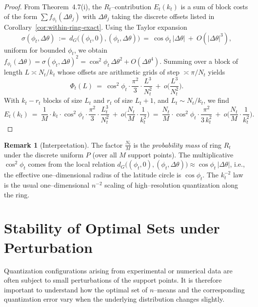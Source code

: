 \documentclass[12pt, reqno]{amsart}
\theoremstyle{plain}
\theoremstyle{definition}
\newtheorem{remark}[subsection]{Remark}
\begin{document}
\begin{proof}
From Theorem~4.7\textup{(i)}, the $R_t$--contribution $E_t(k_t)$ is a sum of block costs of the form
$\sum f_{\phi_t}(\Delta\theta_j)$ with $\Delta\theta_j$ taking the discrete offsets listed in
Corollary~\ref{cor:within-ring-exact}. Using the Taylor expansion
\[
\sigma(\phi_t,\Delta\theta)\ :=\ d_G\big((\phi_t,0),(\phi_t,\Delta\theta)\big)
\ =\ \cos\phi_t\,|\Delta\theta|\ +\ O(|\Delta\theta|^3),
\]
uniform for bounded $\phi_t$, we obtain
$f_{\phi_t}(\Delta\theta)=\sigma(\phi_t,\Delta\theta)^2
= \cos^2\!\phi_t\,\Delta\theta^2 + O(\Delta\theta^4)$. Summing over a block of length
$L\asymp N_t/k_t$ whose offsets are arithmetic grids of step $\asymp \pi/N_t$ yields
\[
\Phi_t(L)\ =\ \cos^2\!\phi_t\cdot \frac{\pi^2}{3}\cdot \frac{L^3}{N_t^2}\ +\ o\!\Big(\frac{L^3}{N_t^2}\Big).
\]
With $k_t-r_t$ blocks of size $L_t$ and $r_t$ of size $L_t+1$, and $L_t\sim N_t/k_t$, we find
\[
E_t(k_t)\ =\ \frac{1}{M}\cdot k_t\cdot \cos^2\!\phi_t\cdot \frac{\pi^2}{3}\cdot \frac{L_t^3}{N_t^2}
\ +\ o\!\Big(\frac{N_t}{M}\cdot\frac{1}{k_t^2}\Big)
\ =\ \frac{N_t}{M}\cdot \cos^2\!\phi_t\cdot \frac{\pi^2}{3\,k_t^2}
\ +\ o\!\Big(\frac{N_t}{M}\cdot\frac{1}{k_t^2}\Big).
\]
\end{proof}

\begin{remark}[Interpretation]
The factor $\frac{N_t}{M}$ is the \emph{probability mass} of ring $R_t$ under the discrete uniform $P$
(over all $M$ support points). The multiplicative $\cos^2\!\phi_t$ comes from the local relation
$d_G\big((\phi_t,0),(\phi_t,\Delta\theta)\big)\approx \cos\phi_t\,|\Delta\theta|$, i.e., the
effective one--dimensional radius of the latitude circle is $\cos\phi_t$. The $k_t^{-2}$ law is the
usual one--dimensional $n^{-2}$ scaling of high--resolution quantization along the ring.
\end{remark}

 
 


\section{Stability of Optimal Sets under Perturbation} \label{sec5}

Quantization configurations arising from experimental or numerical data are often subject to small
perturbations of the support points. It is therefore important to understand how the optimal set of
$n$--means and the corresponding quantization error vary when the underlying distribution changes
slightly. 
\end{document}
